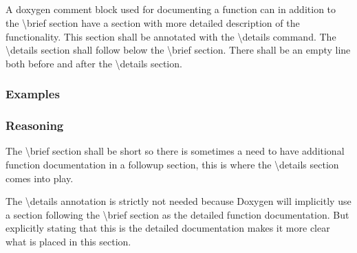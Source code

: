 \subsection*{\doxygenRule{}}

A doxygen comment block used for documenting a function can in addition to the \textbackslash brief section have a section with more detailed description of the functionality. This section shall be annotated with the \textbackslash details command. The \textbackslash details section shall follow below the \textbackslash brief section. There shall be an empty line both before and after the \textbackslash details section.

\subsubsection*{Examples}

\noindent
\begin{minipage}[t]{0.47\textwidth}
    
\end{minipage}\hfill
\begin{minipage}[t]{0.47\textwidth}
    
\end{minipage}

\subsubsection*{Reasoning}

The \textbackslash brief section shall be short so there is sometimes a need to have additional function documentation in a followup section, this is where the \textbackslash details section comes into play.

The \textbackslash details annotation is strictly not needed because Doxygen will implicitly use a section following the \textbackslash brief section as the detailed function documentation. But explicitly stating that this is the detailed documentation makes it more clear what is placed in this section.
